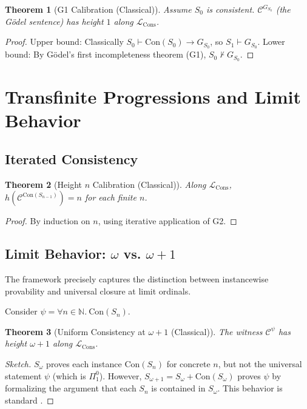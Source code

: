 \documentclass[11pt]{article}
\newtheorem{theorem}{Theorem}[section]
\newcommand{\Con}{\mathrm{Con}}
\newcommand{\LCons}{\mathcal{L}_{\mathrm{Cons}}}
\begin{document}
\begin{theorem}[G1 Calibration (Classical)]
Assume $S_0$ is consistent. $\mathcal C^{G_{S_0}}$ (the Gödel sentence) has height $1$ along $\LCons$.
\end{theorem}
\begin{proof}
Upper bound: Classically $S_0 \vdash \Con(S_0) \to G_{S_0}$, so $S_1 \vdash G_{S_0}$. 
Lower bound: By Gödel's first incompleteness theorem (G1), $S_0 \nvdash G_{S_0}$.
\end{proof}

\section{Transfinite Progressions and Limit Behavior}

\subsection{Iterated Consistency}
\begin{theorem}[Height $n$ Calibration (Classical)]
Along $\LCons$, $h(\mathcal C^{\Con(S_{n-1})}) = n$ for each finite $n$.
\end{theorem}
\begin{proof}
By induction on $n$, using iterative application of G2.
\end{proof}

\subsection{Limit Behavior: $\omega$ vs. $\omega+1$}
The framework precisely captures the distinction between instancewise provability and universal closure at limit ordinals.

Consider $\psi = \forall n \in \mathbb{N}.\ \Con(S_n)$.

\begin{theorem}[Uniform Consistency at $\omega+1$ (Classical)]
The witness $\mathcal{C}^\psi$ has height $\omega+1$ along $\LCons$.
\end{theorem}
\begin{proof}[Sketch]
$S_\omega$ proves each instance $\Con(S_n)$ for concrete $n$, but not the universal statement $\psi$ (which is $\Pi^0_1$). However, $S_{\omega+1} = S_\omega + \Con(S_\omega)$ proves $\psi$ by formalizing the argument that each $S_n$ is contained in $S_\omega$. This behavior is standard \cite{Feferman1962}.
\end{proof}
\end{document}
